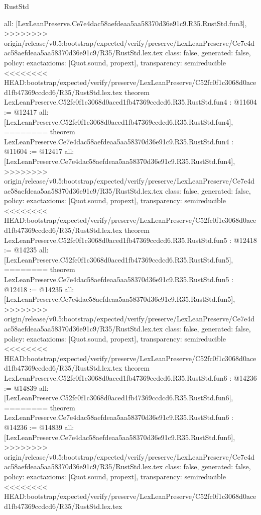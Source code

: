 \begin{lexlean}{RustStd}
\begin{coremodule}
{\begin{coremodule}
{{{{{{{  all: [LexLeanPreserve.Ce7e4dac58aefdeaa5aa58370d36e91c9.R35.RustStd.fun3],
>>>>>>>> origin/release/v0.5:bootstrap/expected/verify/preserve/LexLeanPreserve/Ce7e4dac58aefdeaa5aa58370d36e91c9/R35/RustStd.lex.tex
  class: false,
  generated: false,
  policy: exact{axioms: [Quot.sound, propext]},
  transparency: semireducible
}
<<<<<<<< HEAD:bootstrap/expected/verify/preserve/LexLeanPreserve/C52fc0f1c3068d0aced1fb47369ccdcd6/R35/RustStd.lex.tex
theorem LexLeanPreserve.C52fc0f1c3068d0aced1fb47369ccdcd6.R35.RustStd.fun4 : @11604 := @12417 {
  all: [LexLeanPreserve.C52fc0f1c3068d0aced1fb47369ccdcd6.R35.RustStd.fun4],
========
theorem LexLeanPreserve.Ce7e4dac58aefdeaa5aa58370d36e91c9.R35.RustStd.fun4 : @11604 := @12417 {
  all: [LexLeanPreserve.Ce7e4dac58aefdeaa5aa58370d36e91c9.R35.RustStd.fun4],
>>>>>>>> origin/release/v0.5:bootstrap/expected/verify/preserve/LexLeanPreserve/Ce7e4dac58aefdeaa5aa58370d36e91c9/R35/RustStd.lex.tex
  class: false,
  generated: false,
  policy: exact{axioms: [Quot.sound, propext]},
  transparency: semireducible
}
<<<<<<<< HEAD:bootstrap/expected/verify/preserve/LexLeanPreserve/C52fc0f1c3068d0aced1fb47369ccdcd6/R35/RustStd.lex.tex
theorem LexLeanPreserve.C52fc0f1c3068d0aced1fb47369ccdcd6.R35.RustStd.fun5 : @12418 := @14235 {
  all: [LexLeanPreserve.C52fc0f1c3068d0aced1fb47369ccdcd6.R35.RustStd.fun5],
========
theorem LexLeanPreserve.Ce7e4dac58aefdeaa5aa58370d36e91c9.R35.RustStd.fun5 : @12418 := @14235 {
  all: [LexLeanPreserve.Ce7e4dac58aefdeaa5aa58370d36e91c9.R35.RustStd.fun5],
>>>>>>>> origin/release/v0.5:bootstrap/expected/verify/preserve/LexLeanPreserve/Ce7e4dac58aefdeaa5aa58370d36e91c9/R35/RustStd.lex.tex
  class: false,
  generated: false,
  policy: exact{axioms: [Quot.sound, propext]},
  transparency: semireducible
}
<<<<<<<< HEAD:bootstrap/expected/verify/preserve/LexLeanPreserve/C52fc0f1c3068d0aced1fb47369ccdcd6/R35/RustStd.lex.tex
theorem LexLeanPreserve.C52fc0f1c3068d0aced1fb47369ccdcd6.R35.RustStd.fun6 : @14236 := @14839 {
  all: [LexLeanPreserve.C52fc0f1c3068d0aced1fb47369ccdcd6.R35.RustStd.fun6],
========
theorem LexLeanPreserve.Ce7e4dac58aefdeaa5aa58370d36e91c9.R35.RustStd.fun6 : @14236 := @14839 {
  all: [LexLeanPreserve.Ce7e4dac58aefdeaa5aa58370d36e91c9.R35.RustStd.fun6],
>>>>>>>> origin/release/v0.5:bootstrap/expected/verify/preserve/LexLeanPreserve/Ce7e4dac58aefdeaa5aa58370d36e91c9/R35/RustStd.lex.tex
  class: false,
  generated: false,
  policy: exact{axioms: [Quot.sound, propext]},
  transparency: semireducible
}
<<<<<<<< HEAD:bootstrap/expected/verify/preserve/LexLeanPreserve/C52fc0f1c3068d0aced1fb47369ccdcd6/R35/RustStd.lex.tex
}}}}}}}}}
\end{coremodule}}
\end{coremodule}
\end{lexlean}
